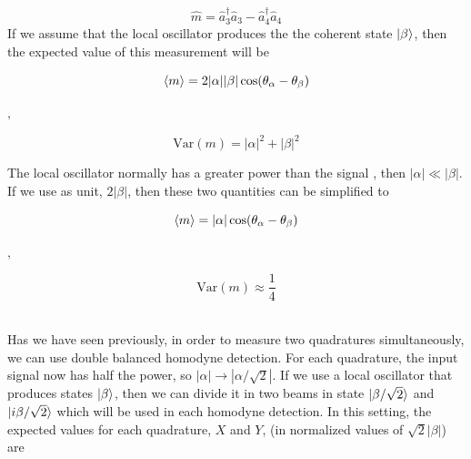 \begin{bibunit}[plain]
%
\begin{equation}
\hat{m} = \hat{a}^\dagger_3\hat{a}_3 - \hat{a}^\dagger_4\hat{a}_4
\end{equation}
%
If we assume that the local oscillator produces the the coherent state $\ket{\beta}$, then the expected value of this measurement will be
%
\begin{center}
	\begin{minipage}{58mm}
		\noindent
		\begin{equation}
			\braket{m} = 2|\alpha||\beta|\cos({\theta_\alpha - \theta_\beta})
		\end{equation}
	\end{minipage}
	$,\quad$
	\begin{minipage}{46mm}
		\noindent
		\begin{equation}
			\textrm{Var}(m) = |\alpha|^2 + |\beta|^2
		\end{equation}
	\end{minipage}
\end{center}
%
The local oscillator normally has a greater power than the signal
, then $|\alpha| \ll |\beta|$. If we use as unit, $2|\beta|$, then these two quantities can be simplified to
%
\begin{center}
	\begin{minipage}{52mm}
		\noindent
		\begin{equation}
			\braket{m} = |\alpha|\cos({\theta_\alpha - \theta_\beta})
		\end{equation}
	\end{minipage}
	$,\quad$
	\begin{minipage}{34mm}
		\noindent
		\begin{equation}
			\textrm{Var}(m) \approx \frac{1}{4}
		\end{equation}
	\end{minipage}
\end{center}
%
\cite{hans2004}
\\
Has we have seen previously, in order to measure two quadratures simultaneously, we can use double balanced homodyne detection. For each quadrature, the input signal now has half the power, so $|\alpha| \rightarrow |\alpha/\sqrt{2}|$.  If we use a local oscillator that produces states $\ket{\beta}$, then we can divide it in two beams in state $\ket{\beta/\sqrt{2}}$ and $\ket{i\beta/\sqrt{2}}$ which will be used in each homodyne detection. In this setting, the expected values for each quadrature, $X$ and $Y$, (in normalized values of $\sqrt{2}|\beta|$) are

\end{bibunit}
